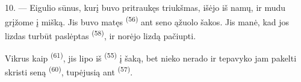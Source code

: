 10. --- Eigulio sūnus, kurį buvo pritraukęs  triukšmas,
išėjo iš namų, ir mudu grįžome į mišką. Jis buvo matęs 
\textsuperscript{(56)} ant seno ąžuolo šakos. Jis manė, kad jos lizdas turbūt
paslėptas  \textsuperscript{(58)}, ir norėjo lizdą pačiupti.

Vikrus kaip  \textsuperscript{(61)}, jis lipo iš 
\textsuperscript{(55)} į šaką, bet nieko nerado ir tepavyko jam pakelti skristi seną
 \textsuperscript{(60)}, tupėjusią ant 
\textsuperscript{(57)}.

\VUsaut{4.0mm}
\VUfilet{22mm}

